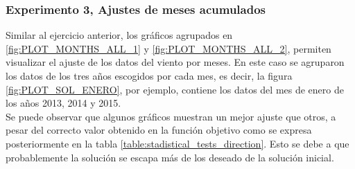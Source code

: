 \subsubsection{Experimento 3, Ajustes de meses acumulados}
Similar al ejercicio anterior, los gráficos agrupados en \ref{fig:PLOT_MONTHS_ALL_1} y \ref{fig:PLOT_MONTHS_ALL_2}, permiten visualizar el ajuste de los datos del viento por meses. En este caso se agruparon los datos de los tres años escogidos por cada mes, es decir, la figura \ref{fig:PLOT_SOL_ENERO}, por ejemplo, contiene los datos del mes de enero de los años 2013, 2014 y 2015.\\
Se puede observar que algunos gráficos muestran un mejor ajuste que otros, a pesar del correcto valor obtenido en la función objetivo como se expresa posteriormente en la tabla \ref{table:stadistical_tests_direction}. Esto se debe a que probablemente la solución se escapa más de los deseado de la solución inicial. 
